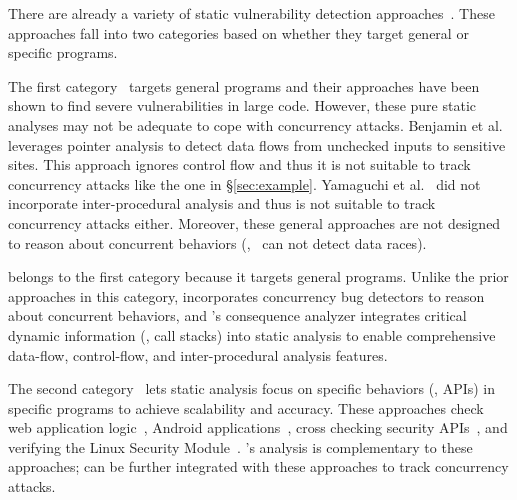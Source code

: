  There are already a 
variety of static vulnerability detection 
approaches~\cite{livshits05finding,yamaguchi:sp14,felmetsger:usec10,
flowdroid:pldi14,srivastava:pldi11,zhang:usenix:sec02}. 
These approaches fall into two categories based on whether they 
target general or specific programs.

The first category~\cite{livshits05finding,yamaguchi:sp14} targets general 
programs and their approaches have been shown to find severe vulnerabilities in large 
code. However, these pure static analyses may not be adequate to cope with 
concurrency attacks. Benjamin et al.~\cite{livshits05finding} leverages pointer 
analysis to detect data flows from unchecked inputs to sensitive sites. 
This approach ignores control flow and thus it is not suitable to track 
concurrency attacks like the \libsafe one in \S\ref{sec:example}. Yamaguchi 
et al.~\cite{yamaguchi:sp14} did not incorporate inter-procedural analysis and thus 
is not suitable to track concurrency attacks either. Moreover, these general 
approaches are not designed to reason about concurrent behaviors 
(\eg,~\cite{yamaguchi:sp14} can not detect data races).

\xxx belongs to the first category because it targets general 
programs. Unlike the prior approaches in this category, \xxx incorporates 
concurrency bug detectors to reason about concurrent behaviors, and \xxx's 
consequence analyzer integrates critical dynamic information (\ie, call stacks) 
into static analysis to enable comprehensive data-flow, control-flow, 
and inter-procedural analysis features.

The second category~\cite{felmetsger:usec10,
flowdroid:pldi14,srivastava:pldi11,zhang:usenix:sec02} lets static analysis 
focus on specific behaviors (\eg, APIs) in specific programs to achieve 
scalability and accuracy. These approaches check web application 
logic~\cite{felmetsger:usec10}, Android applications~\cite{flowdroid:pldi14}, 
cross checking security APIs~\cite{srivastava:pldi11}, and verifying the 
Linux Security Module~\cite{zhang:usenix:sec02}. \xxx's analysis is 
complementary to these approaches; \xxx can be further integrated with these 
approaches to track concurrency attacks.

% 

